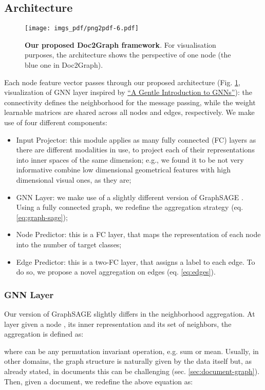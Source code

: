 \documentclass[runningheads]{llncs}
\begin{document}
\subsection{Architecture}
\label{sec:architecture}
\begin{figure}[t]
    \centering
    \texttt{[image: imgs\_pdf/png2pdf-6.pdf]}
    \caption{\textbf{Our proposed Doc2Graph framework}. For visualisation purposes, the architecture shows the perspective of one node (the blue one in Doc2Graph).}
    \label{fig:model}
\end{figure}
Each node feature vector passes through our proposed architecture (Fig. \ref{fig:model}, visualization of GNN layer inspired by \href{https://distill.pub/2021/gnn-intro/}{``A Gentle Introduction to GNNs''}): the connectivity defines the neighborhood for the message passing, while the weight learnable matrices are shared across all nodes and edges, respectively. We make use of four different components:
\begin{itemize}
    \item Input Projector: this module applies as many fully connected (FC) layers as there are different modalities in use, to project each of their representations into inner spaces of the same dimension; e.g., we found it to be not very informative combine low dimensional geometrical features with high dimensional visual ones, as they are;
    \item GNN Layer: we make use of a slightly different version of GraphSAGE \cite{hamilton2017inductive}. Using a fully connected graph, we redefine the aggregation strategy (eq. \ref{eq:graph-sage});
    \item Node Predictor: this is a FC layer, that maps the representation of each node into the number of target classes;
    \item Edge Predictor: this is a two-FC layer, that assigns a label to each edge.  To do so, we propose a novel aggregation on edges (eq. \ref{eq:edges}).
\end{itemize}

\subsubsection{GNN Layer}
\label{sec:gnn}
Our version of GraphSAGE slightly differs in the neighborhood aggregation. At layer  given a node ,  its inner representation and  its set of neighbors, the aggregation is defined as:

where  can be any permutation invariant operation, e.g. sum or mean.
Usually, in other domains, the graph structure is naturally given by the data itself but, as already stated, in documents this can be challenging (sec. \ref{sec:document-graph}). Then, given a document, we redefine the above equation as:
\end{document}
